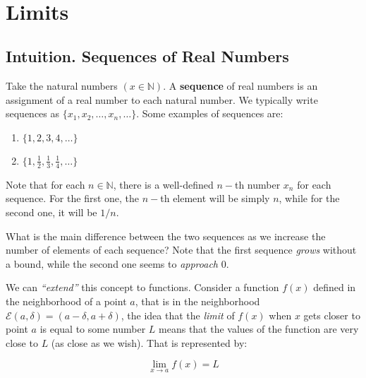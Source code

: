 \documentclass[11pt]{article}
\providecommand{\tightlist}{%
      \setlength{\itemsep}{0pt}\setlength{\parskip}{0pt}}
\begin{document}
    \begin{center}
    \end{center}
    { \hspace*{\fill} \\}
    
    \hypertarget{limits}{%
\section{Limits}\label{limits}}

\hypertarget{intuition.-sequences-of-real-numbers}{%
\subsection{Intuition. Sequences of Real
Numbers}\label{intuition.-sequences-of-real-numbers}}

Take the natural numbers \((x\in\mathbb{N})\). A \textbf{sequence} of
real numbers is an assignment of a real number to each natural number.
We typically write sequences as \(\{x_1,x_2,\ldots,x_n,\ldots\}\). Some
examples of sequences are:

\begin{enumerate}
\def\labelenumi{\arabic{enumi}.}
\tightlist
\item
  \(\{1,2,3,4,\ldots\}\)
\item
  \(\{1,\frac{1}{2},\frac{1}{3},\frac{1}{4},\ldots\}\)
\end{enumerate}

Note that for each \(n\in\mathbb{N}\), there is a well-defined \(n-\)th
number \(x_n\) for each sequence. For the first one, the \(n-\)th
element will be simply \(n\), while for the second one, it will be
\(1/n\).

What is the main difference between the two sequences as we increase the
number of elements of each sequence? Note that the first sequence
\emph{grows} without a bound, while the second one seems to
\emph{approach} \(0\).

We can \emph{``extend''} this concept to functions. Consider a function
\(f(x)\) defined in the neighborhood of a point \(a\), that is in the
neighborhood \(\mathcal{E}(a,\delta) = (a-\delta,a + \delta)\), the idea
that the \emph{limit} of \(f(x)\) when \(x\) gets closer to point \(a\)
is equal to some number \(L\) means that the values of the function are
very close to \(L\) (as close as we wish). That is represented by:

\[
\lim_{x\rightarrow a} f(x) = L
\]
\end{document}
